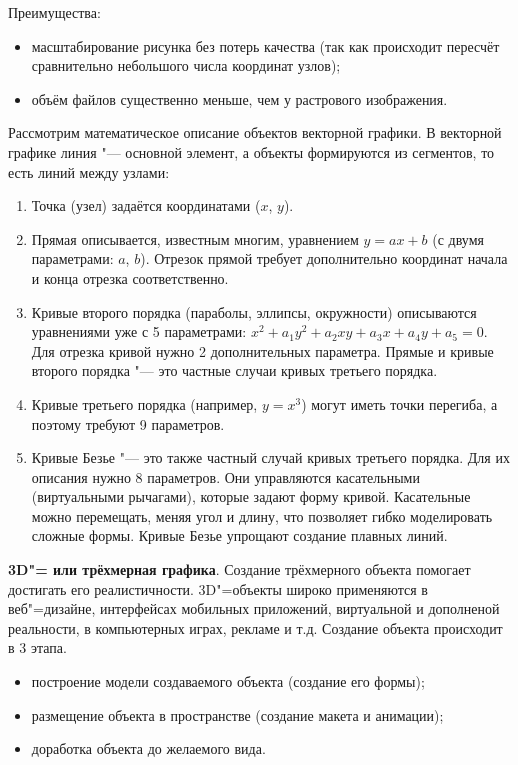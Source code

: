 Преимущества:
\begin{itemize}
    \item масштабирование рисунка без потерь качества (так как происходит пересчёт сравнительно небольшого числа координат узлов);
    \item объём файлов существенно меньше, чем у растрового изображения.
\end{itemize}

Рассмотрим математическое описание объектов векторной графики. В векторной графике линия "--- основной элемент, а объекты формируются из сегментов, то есть линий между узлами: \cite{vec_graphics}
\begin{enumerate}
    \item Точка (узел) задаётся координатами ($x$, $y$).
    \item Прямая описывается, известным многим, уравнением $y = ax + b$ (с двумя параметрами: $a$, $b$). Отрезок прямой требует дополнительно координат начала и конца отрезка соответственно.
    \item Кривые второго порядка (параболы, эллипсы, окружности) описываются уравнениями уже с 5 параметрами: $x^{2} + a_{1}y^{2} + a_{2}xy + a_{3}x + a_{4}y + a_{5} = 0$. Для отрезка кривой нужно 2 дополнительных параметра.
    Прямые и кривые второго порядка "--- это частные случаи кривых третьего порядка.
    \item Кривые третьего порядка (например, $y = x^{3}$) могут иметь точки перегиба, а поэтому требуют 9 параметров.
    \item Кривые Безье "--- это также частный случай кривых третьего порядка. Для их описания нужно 8 параметров. Они управляются касательными (виртуальными рычагами), которые задают форму кривой. Касательные можно перемещать, меняя угол и длину, что позволяет гибко моделировать сложные формы. Кривые Безье упрощают создание плавных линий.
\end{enumerate}

\textbf{3D"= или трёхмерная графика}. Создание трёхмерного объекта помогает достигать его реалистичности. 3D"=объекты широко применяются в веб"=дизайне, интерфейсах мобильных приложений, виртуальной и дополненой реальности, в компьютерных играх, рекламе и т.д. Создание объекта происходит в 3 этапа.
\begin{itemize}
    \item построение модели создаваемого объекта (создание его формы);
    \item размещение объекта в пространстве (создание макета и анимации);
    \item доработка объекта до желаемого вида.
\end{itemize}

